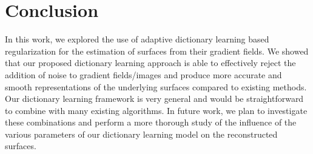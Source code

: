 \documentclass{article}
\begin{document}
\section{Conclusion}
In this work, we explored the use of adaptive dictionary learning based regularization for the estimation of surfaces from their gradient fields. We showed that our proposed dictionary learning approach is able to effectively reject the addition of noise to gradient fields/images and produce more accurate and smooth representations of the underlying surfaces compared to existing methods. Our dictionary learning framework is very general and would be straightforward to combine with many existing algorithms. In future work, we plan to investigate these combinations and perform a more thorough study of the influence of the various parameters of our dictionary learning model on the reconstructed surfaces.


\ninept

\end{document}
